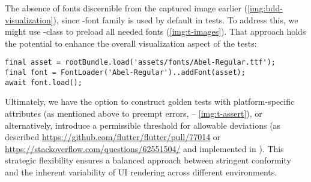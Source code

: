 \noindent The absence of fonts discernible from the captured image earlier (\cref{img:bdd-visualization}), since 
-font family is used by default in tests. To address this, we might use -class to preload all 
needed fonts (\cref{img:t-images}). That approach holds the potential to enhance the overall visualization aspect of 
the tests:

\begin{lstlisting}
final asset = rootBundle.load('assets/fonts/Abel-Regular.ttf');
final font = FontLoader('Abel-Regular')..addFont(asset);
await font.load();
\end{lstlisting}

\noindent Ultimately, we have the option to construct golden tests with platform-specific attributes (as mentioned above 
to preempt errors, -- \cref{img:t-assert}), or alternatively, introduce a permissible threshold for allowable deviations 
(as described 
\href{https://github.com/flutter/flutter/pull/77014\#issuecomment-1048896776}{https://github.com/flutter/flutter/pull/77014}
or \href{https://stackoverflow.com/questions/62551504/flutter-golden-image-tests-diff-threshold}{https://stackoverflow.com/questions/62551504/}
and implemented in ). This strategic flexibility ensures a balanced approach between stringent 
conformity and the inherent variability of UI rendering across different environments.
